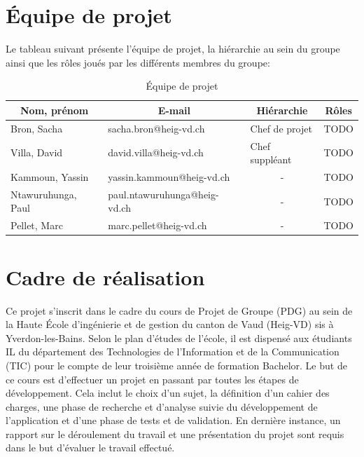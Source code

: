 \documentclass[11pt,a4paper,oldfontcommands]{memoir}
\begin{document}
\section{Équipe de projet}

Le tableau suivant présente l'équipe de projet, la hiérarchie au sein du groupe ainsi que les rôles joués par les différents membres du groupe:

\begin{table}[h]
\centering
\begin{tabular}{|l|l|c|l|}
\hline
\multicolumn{1}{|c|}{\textbf{Nom, prénom}} & \multicolumn{1}{c|}{\textbf{E-mail}} & \textbf{Hiérarchie}                 & \multicolumn{1}{c|}{\textbf{Rôles}} \\ \hline
Bron, Sacha                                & sacha.bron@heig-vd.ch                & \multicolumn{1}{l|}{Chef de projet} & TODO                                    \\ \hline
Villa, David                               & david.villa@heig-vd.ch               & \multicolumn{1}{l|}{Chef suppléant} & TODO                                    \\ \hline
Kammoun, Yassin                            & yassin.kammoun@heig-vd.ch            & -                                   & TODO                                    \\ \hline
Ntawuruhunga, Paul                         & paul.ntawuruhunga@heig-vd.ch         & -                                   & TODO                                    \\ \hline
Pellet, Marc                               & marc.pellet@heig-vd.ch               & -                                   & TODO                                    \\ \hline
\end{tabular}
\caption{Équipe de projet}
\end{table}

\section{Cadre de réalisation}

Ce projet s'inscrit dans le cadre du cours de Projet de Groupe (PDG) au sein de la Haute École d'ingénierie et de gestion du canton de Vaud (Heig-VD) sis à Yverdon-les-Bains. Selon le plan d'études de l'école, il est dispensé aux étudiants IL du département des Technologies de l'Information et de la Communication (TIC) pour le compte de leur troisième année de formation Bachelor. Le but de ce cours est d’effectuer un projet en passant par toutes les étapes de développement. Cela inclut le choix d'un sujet, la définition d’un cahier des charges, une phase de recherche et d'analyse suivie du développement de l’application et d’une phase de tests et de validation. En dernière instance, un rapport sur le déroulement du travail et une présentation du projet sont requis dans le but d'évaluer le travail effectué.
\end{document}

